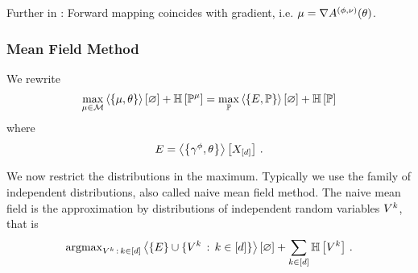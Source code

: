 Further in \cite{wainwright_graphical_2008}: 
Forward mapping coincides with gradient, i.e. $\mu = \nabla A^{(\phi,\nu)}(\theta)$.


\subsubsection{Mean Field Method}



We rewrite 
\begin{align*}
	\max_{\mu\in\mathcal{M}}  \left\langle \left\{\mu,\theta\right\}\right\rangle \left[ \varnothing \right] + \mathbb{H}\left[\mathbb{P}^{\mu}\right] 
	=
	\max_{\mathbb{P}} \left\langle \left\{E,\mathbb{P}\right\}\right\rangle \left[ \varnothing \right] + \mathbb{H}\left[\mathbb{P}\right]
\end{align*}
where
	\[ E = \left\langle \left\{\gamma^{\phi},\theta\right\}\right\rangle \left[ X_{[d]} \right] \, . \]

We now restrict the distributions in the maximum.
Typically we use the family of independent distributions, also called naive mean field method.
The naive mean field is the approximation by distributions of independent random variables $V^{k}$, that is
\begin{align*}
	\mathrm{argmax}_{V^{k} \, : \, k\in[d]} \left\langle \{E\} \cup \{V^{k} \, : \, k\in[d]\}\right\rangle \left[ \varnothing \right]
	+ \sum_{k\in[d]} \mathbb{H}\left[V^{k}\right] \, . 
\end{align*}


